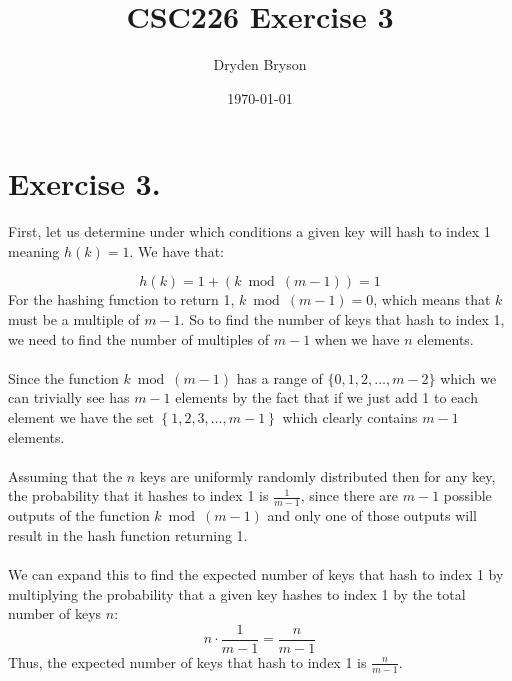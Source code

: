 \documentclass{article}
\title{CSC226 Exercise 3}
\author{Dryden Bryson}
\date{\today}
\begin{document}
\maketitle
\newpage

\section*{Exercise 3.}
First, let us determine under which conditions a given key will hash to index 1 meaning $h(k)=1$. We have that:

$$h(k)=1+(k \bmod(m-1))=1$$
For the hashing function to return 1, $k \bmod(m-1) = 0$, which means that $k$ must be a multiple of $m-1$. So to find the number of keys that hash to index 1, we need to find the number of multiples of $m-1$ when we have $n$ elements.\\\\
Since the function $k\bmod(m-1)$ has a range of $\{0,1,2,\dots,m-2\}$ which we can trivially see has $m-1$ elements by the fact that if we just add 1 to each element we have the set $\left\{ 1,2,3,\dots,m-1 \right\} $ which clearly contains $m-1$ elements.\\\\
Assuming that the $n$ keys are uniformly randomly distributed then for any key, the probability that it hashes to index 1 is $\frac{1}{m-1}$, since there are $m-1$ possible outputs of the function $k \bmod(m-1)$ and only one of those outputs will result in the hash function returning 1.\\\\
We can expand this to find the expected number of keys that hash to index 1 by multiplying the probability that a given key hashes to index 1 by the total number of keys $n$:
$$n \cdot \frac{1}{m-1} = \frac{n}{m-1}$$
Thus, the expected number of keys that hash to index 1 is $\frac{n}{m-1}$.
\end{document}
